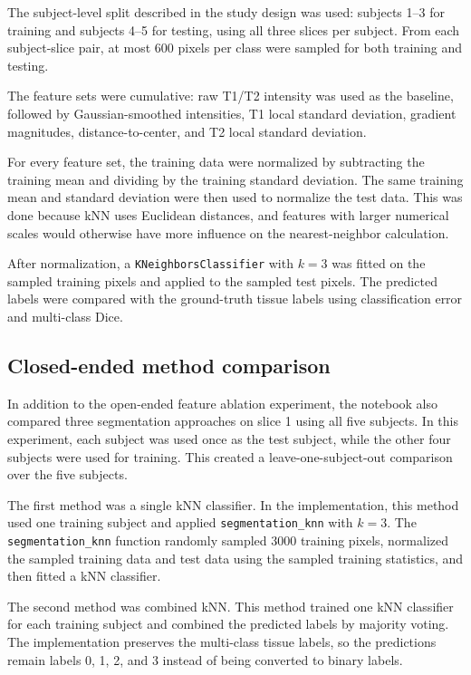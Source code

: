 \documentclass[10pt,a4paper,twoside]{article}
\begin{document}
The subject-level split described in the study design was used: subjects 1--3 for training and subjects 4--5 for testing, using all three slices per subject. From each subject-slice pair, at most 600 pixels per class were sampled for both training and testing.

The feature sets were cumulative: raw T1/T2 intensity was used as the baseline, followed by Gaussian-smoothed intensities, T1 local standard deviation, gradient magnitudes, distance-to-center, and T2 local standard deviation.

For every feature set, the training data were normalized by subtracting the training mean and dividing by the training standard deviation. The same training mean and standard deviation were then used to normalize the test data. This was done because kNN uses Euclidean distances, and features with larger numerical scales would otherwise have more influence on the nearest-neighbor calculation.

After normalization, a \texttt{KNeighborsClassifier} with $k=3$ was fitted on the sampled training pixels and applied to the sampled test pixels. The predicted labels were compared with the ground-truth tissue labels using classification error and multi-class Dice.

\subsection{Closed-ended method comparison}

In addition to the open-ended feature ablation experiment, the notebook also compared three segmentation approaches on slice 1 using all five subjects. In this experiment, each subject was used once as the test subject, while the other four subjects were used for training. This created a leave-one-subject-out comparison over the five subjects.

The first method was a single kNN classifier. In the implementation, this method used one training subject and applied \texttt{segmentation\_knn} with $k=3$. The \texttt{segmentation\_knn} function randomly sampled 3000 training pixels, normalized the sampled training data and test data using the sampled training statistics, and then fitted a kNN classifier.

The second method was combined kNN. This method trained one kNN classifier for each training subject and combined the predicted labels by majority voting. The implementation preserves the multi-class tissue labels, so the predictions remain labels 0, 1, 2, and 3 instead of being converted to binary labels.
\end{document}
